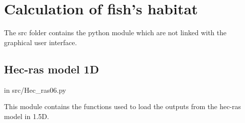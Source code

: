\documentclass[letterpaper,10pt,english]{sphinxmanual}
\begin{document}
\chapter{Calculation of fish's habitat}
\label{\detokenize{index:calculation-of-fish-s-habitat}}
The src folder contains the python module which are not linked with the graphical user interface.
\label{\detokenize{index:module-src}}

\section{Hec-ras model 1D}
\label{\detokenize{index:hec-ras-model-1d}}
in src/Hec\_ras06.py

This module contains the functions used to load the outputs from the hec-ras model in 1.5D.
\label{\detokenize{index:module-src.Hec_ras06}}
\end{document}
